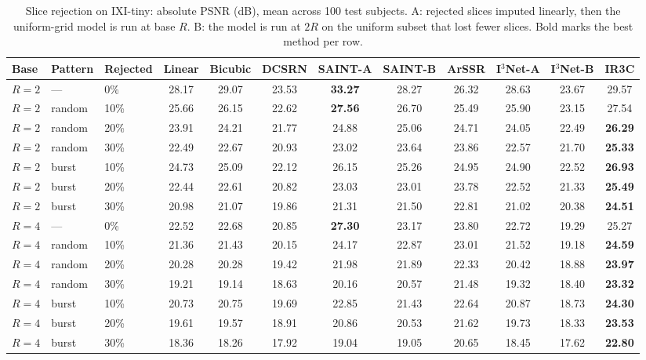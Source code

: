 \begin{table}[pos=!htbp]
\caption{Slice rejection on IXI-tiny: absolute PSNR (dB), mean across 100 test subjects. A: rejected slices imputed linearly, then the uniform-grid model is run at base $R$. B: the model is run at $2R$ on the uniform subset that lost fewer slices. Bold marks the best method per row.}
\label{tab:reject-abs-ixi}
\footnotesize
\begin{tabular*}{\textwidth}{@{\extracolsep{\fill}}lllccccccccc@{}}
\toprule
Base & Pattern & Rejected & Linear & Bicubic & DCSRN & SAINT-A & SAINT-B & ArSSR & I$^3$Net-A & I$^3$Net-B & IR3C \\
\midrule
$R=2$ & --- & 0\% & 28.17 & 29.07 & 23.53 & \textbf{33.27} & 28.27 & 26.32 & 28.63 & 23.67 & 29.57 \\
$R=2$ & random & 10\% & 25.66 & 26.15 & 22.62 & \textbf{27.56} & 26.70 & 25.49 & 25.90 & 23.15 & 27.54 \\
$R=2$ & random & 20\% & 23.91 & 24.21 & 21.77 & 24.88 & 25.06 & 24.71 & 24.05 & 22.49 & \textbf{26.29} \\
$R=2$ & random & 30\% & 22.49 & 22.67 & 20.93 & 23.02 & 23.64 & 23.86 & 22.57 & 21.70 & \textbf{25.33} \\
$R=2$ & burst & 10\% & 24.73 & 25.09 & 22.12 & 26.15 & 25.26 & 24.95 & 24.90 & 22.52 & \textbf{26.93} \\
$R=2$ & burst & 20\% & 22.44 & 22.61 & 20.82 & 23.03 & 23.01 & 23.78 & 22.52 & 21.33 & \textbf{25.49} \\
$R=2$ & burst & 30\% & 20.98 & 21.07 & 19.86 & 21.31 & 21.50 & 22.81 & 21.02 & 20.38 & \textbf{24.51} \\
$R=4$ & --- & 0\% & 22.52 & 22.68 & 20.85 & \textbf{27.30} & 23.17 & 23.80 & 22.72 & 19.29 & 25.27 \\
$R=4$ & random & 10\% & 21.36 & 21.43 & 20.15 & 24.17 & 22.87 & 23.01 & 21.52 & 19.18 & \textbf{24.59} \\
$R=4$ & random & 20\% & 20.28 & 20.28 & 19.42 & 21.98 & 21.89 & 22.33 & 20.42 & 18.88 & \textbf{23.97} \\
$R=4$ & random & 30\% & 19.21 & 19.14 & 18.63 & 20.16 & 20.57 & 21.48 & 19.32 & 18.40 & \textbf{23.32} \\
$R=4$ & burst & 10\% & 20.73 & 20.75 & 19.69 & 22.85 & 21.43 & 22.64 & 20.87 & 18.73 & \textbf{24.30} \\
$R=4$ & burst & 20\% & 19.61 & 19.57 & 18.91 & 20.86 & 20.53 & 21.62 & 19.73 & 18.33 & \textbf{23.53} \\
$R=4$ & burst & 30\% & 18.36 & 18.26 & 17.92 & 19.04 & 19.05 & 20.65 & 18.45 & 17.62 & \textbf{22.80} \\
\bottomrule
\end{tabular*}
\end{table}
